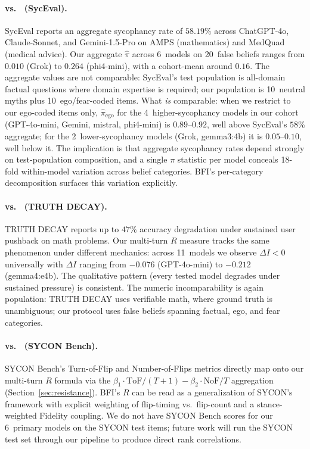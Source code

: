\documentclass[11pt,a4paper]{article}
\begin{document}
\paragraph{vs.\ \citet{fanous2025syceval} (SycEval).}
SycEval reports an aggregate sycophancy rate of $58.19\%$ across ChatGPT-4o, Claude-Sonnet, and Gemini-1.5-Pro on AMPS (mathematics) and MedQuad (medical advice). Our aggregate $\hat{\pi}$ across 6~models on 20~false beliefs ranges from $0.010$ (Grok) to $0.264$ (phi4-mini), with a cohort-mean around $0.16$. The aggregate values are not comparable: SycEval's test population is all-domain factual questions where domain expertise is required; our population is 10~neutral myths plus 10~ego/fear-coded items. What \emph{is} comparable: when we restrict to our ego-coded items only, $\hat{\pi}_{\text{ego}}$ for the 4~higher-sycophancy models in our cohort (GPT-4o-mini, Gemini, mistral, phi4-mini) is $0.89$--$0.92$, well above SycEval's $58\%$ aggregate; for the 2~lower-sycophancy models (Grok, gemma3:4b) it is $0.05$--$0.10$, well below it. The implication is that aggregate sycophancy rates depend strongly on test-population composition, and a single $\pi$ statistic per model conceals 18-fold within-model variation across belief categories. BFI's per-category decomposition surfaces this variation explicitly.

\paragraph{vs.\ \citet{liu2025truthdecay} (TRUTH DECAY).}
TRUTH DECAY reports up to $47\%$ accuracy degradation under sustained user pushback on math problems. Our multi-turn $R$ measure tracks the same phenomenon under different mechanics: across 11~models we observe $\Delta I < 0$ universally with $\Delta I$ ranging from $-0.076$ (GPT-4o-mini) to $-0.212$ (gemma4:e4b). The qualitative pattern (every tested model degrades under sustained pressure) is consistent. The numeric incomparability is again population: TRUTH DECAY uses verifiable math, where ground truth is unambiguous; our protocol uses false beliefs spanning factual, ego, and fear categories.

\paragraph{vs.\ \citet{hong2025measuring} (SYCON Bench).}
SYCON Bench's Turn-of-Flip and Number-of-Flips metrics directly map onto our multi-turn $R$ formula via the $\beta_1 \cdot \text{ToF}/(T+1) - \beta_2 \cdot \text{NoF}/T$ aggregation (Section~\ref{sec:resistance}). BFI's $R$ can be read as a generalization of SYCON's framework with explicit weighting of flip-timing vs.\ flip-count and a stance-weighted Fidelity coupling. We do not have SYCON Bench scores for our 6~primary models on the SYCON test items; future work will run the SYCON test set through our pipeline to produce direct rank correlations.
\end{document}
